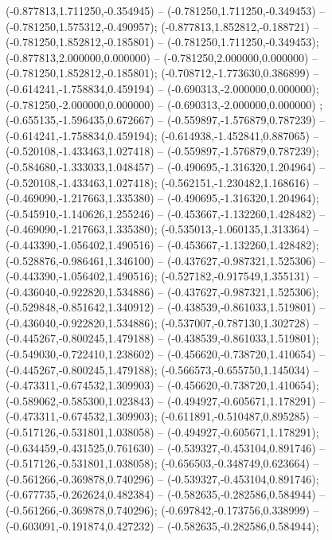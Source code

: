  (-0.877813,1.711250,-0.354945) -- (-0.781250,1.711250,-0.349453) -- (-0.781250,1.575312,-0.490957);
 (-0.877813,1.852812,-0.188721) -- (-0.781250,1.852812,-0.185801) -- (-0.781250,1.711250,-0.349453);
 (-0.877813,2.000000,0.000000) -- (-0.781250,2.000000,0.000000) -- (-0.781250,1.852812,-0.185801);
 (-0.708712,-1.773630,0.386899) -- (-0.614241,-1.758834,0.459194) -- (-0.690313,-2.000000,0.000000);
 (-0.781250,-2.000000,0.000000) -- (-0.690313,-2.000000,0.000000) ;
 (-0.655135,-1.596435,0.672667) -- (-0.559897,-1.576879,0.787239) -- (-0.614241,-1.758834,0.459194);
 (-0.614938,-1.452841,0.887065) -- (-0.520108,-1.433463,1.027418) -- (-0.559897,-1.576879,0.787239);
 (-0.584680,-1.333033,1.048457) -- (-0.490695,-1.316320,1.204964) -- (-0.520108,-1.433463,1.027418);
 (-0.562151,-1.230482,1.168616) -- (-0.469090,-1.217663,1.335380) -- (-0.490695,-1.316320,1.204964);
 (-0.545910,-1.140626,1.255246) -- (-0.453667,-1.132260,1.428482) -- (-0.469090,-1.217663,1.335380);
 (-0.535013,-1.060135,1.313364) -- (-0.443390,-1.056402,1.490516) -- (-0.453667,-1.132260,1.428482);
 (-0.528876,-0.986461,1.346100) -- (-0.437627,-0.987321,1.525306) -- (-0.443390,-1.056402,1.490516);
 (-0.527182,-0.917549,1.355131) -- (-0.436040,-0.922820,1.534886) -- (-0.437627,-0.987321,1.525306);
 (-0.529848,-0.851642,1.340912) -- (-0.438539,-0.861033,1.519801) -- (-0.436040,-0.922820,1.534886);
 (-0.537007,-0.787130,1.302728) -- (-0.445267,-0.800245,1.479188) -- (-0.438539,-0.861033,1.519801);
 (-0.549030,-0.722410,1.238602) -- (-0.456620,-0.738720,1.410654) -- (-0.445267,-0.800245,1.479188);
 (-0.566573,-0.655750,1.145034) -- (-0.473311,-0.674532,1.309903) -- (-0.456620,-0.738720,1.410654);
 (-0.589062,-0.585300,1.023843) -- (-0.494927,-0.605671,1.178291) -- (-0.473311,-0.674532,1.309903);
 (-0.611891,-0.510487,0.895285) -- (-0.517126,-0.531801,1.038058) -- (-0.494927,-0.605671,1.178291);
 (-0.634459,-0.431525,0.761630) -- (-0.539327,-0.453104,0.891746) -- (-0.517126,-0.531801,1.038058);
 (-0.656503,-0.348749,0.623664) -- (-0.561266,-0.369878,0.740296) -- (-0.539327,-0.453104,0.891746);
 (-0.677735,-0.262624,0.482384) -- (-0.582635,-0.282586,0.584944) -- (-0.561266,-0.369878,0.740296);
 (-0.697842,-0.173756,0.338999) -- (-0.603091,-0.191874,0.427232) -- (-0.582635,-0.282586,0.584944);
